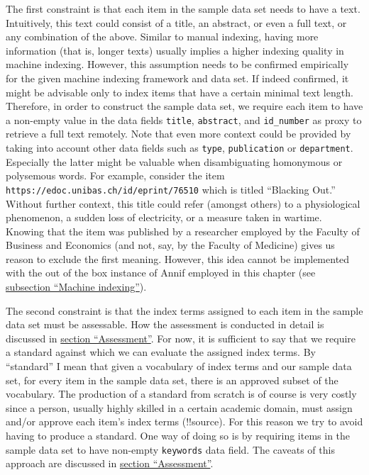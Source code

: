 The first constraint is that each item in the sample data set needs to
have a text. Intuitively, this text could consist of a title, an
abstract, or even a full text, or any combination of the above. Similar
to manual indexing, having more information (that is, longer texts)
usually implies a higher indexing quality in machine indexing. However,
this assumption needs to be confirmed empirically for the given machine
indexing framework and data set. If indeed confirmed, it might be
advisable only to index items that have a certain minimal text length.
Therefore, in order to construct the sample data set, we require each
item to have a non-empty value in the data fields \texttt{title},
\texttt{abstract}, and \texttt{id\_number} as proxy to retrieve a full
text remotely. Note that even more context could be provided by taking
into account other data fields such as \texttt{type},
\texttt{publication} or \texttt{department}. Especially the latter might
be valuable when disambiguating homonymous or polysemous words. For
example, consider the item
\texttt{https://edoc.unibas.ch/id/eprint/76510} which is titled
``Blacking Out.'' Without further context, this title could refer
(amongst others) to a physiological phenomenon, a sudden loss of
electricity, or a measure taken in wartime. Knowing that the item was
published by a researcher employed by the Faculty of Business and
Economics (and not, say, by the Faculty of Medicine) gives us reason to
exclude the first meaning. However, this idea cannot be implemented with
the out of the box instance of Annif employed in this chapter (see
\protect\hyperlink{machine-indexing}{subsection ``Machine indexing''}).

The second constraint is that the index terms assigned to each item in
the sample data set must be assessable. How the assessment is conducted
in detail is discussed in \protect\hyperlink{assessment}{section
``Assessment''}. For now, it is sufficient to say that we require a
standard against which we can evaluate the assigned index terms. By
``standard'' I mean that given a vocabulary of index terms and our
sample data set, for every item in the sample data set, there is an
approved subset of the vocabulary. The production of a standard from
scratch is of course is very costly since a person, usually highly
skilled in a certain academic domain, must assign and/or approve each
item's index terms (!!source). For this reason we try to avoid having to
produce a standard. One way of doing so is by requiring items in the
sample data set to have non-empty \texttt{keywords} data field. The
caveats of this approach are discussed in
\protect\hyperlink{assessment}{section ``Assessment''}.


